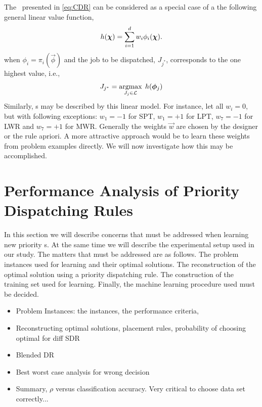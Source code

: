 \documentclass[smallextended]{svjour3}
\begin{document}
The \cdr\ presented in \cref{eq:CDR} can be 
considered as a special case of a the following general linear value function,
\begin{equation}\label{eq:jssp:linweights}
	h(\bm \chi)=\sum_{i=1}^d w_i\phi_i(\bm \chi).
\end{equation}
when $\phi_i=\pi_i(\vec{\phi})$ and the job to be dispatched, $J_{j^*}$, corresponds to the one highest 
value, i.e.,
\begin{equation}\label{eq:lin}
	J_{j^*}=\mathop{\rm argmax}_{J_j\in \mathcal{L}}\; h(\bm{\phi}_j)
\end{equation}
Similarly, \sdr s may be described by this linear model. For instance, let all 
$w_i=0$, but with following exceptions: $w_1=-1$ for SPT, $w_1=+1$ for LPT, 
$w_7=-1$ for LWR and $w_7=+1$ for MWR. Generally the weights $\vec{w}$ are 
chosen by the designer or the 
rule apriori.  A more attractive approach would be to learn these weights from 
problem examples directly. We will now investigate how this may be accomplished.

\vfill
{}
\pagebreak %
\section{Performance Analysis of Priority Dispatching Rules}\label{sec:learnCDR}

In this section we will describe concerns that must be addressed when learning 
new priority \dr s. At the same time we will describe the experimental setup 
used in our study. The matters that must be addressed are as 
follows. The problem instances used for learning and their optimal solutions. 
The reconstruction of the optimal solution using a priority dispatching rule. 
The construction of the training set used for learning. Finally, the
machine learning procedure used must be decided.

\begin{itemize}
\item Problem Instances: the instances, the performance criteria,
\item Reconstructing optimal solutions, placement rules, probability of choosing optimal for diff SDR
\item Blended DR
\item Best worst case analysis for wrong decision
\item Summary, $\rho$ versus classification accuracy. Very critical to choose data set correctly...
\end{itemize}
\end{document}
